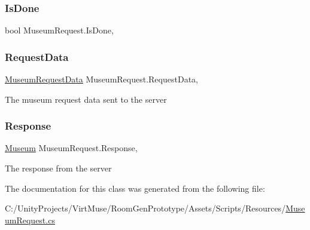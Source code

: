 \mbox{\label{class_museum_request_afed65eefeb6ae0675fe955f65e80e671}} 
\subsubsection{\texorpdfstring{Is\+Done}{IsDone}}
{\footnotesize\ttfamily bool Museum\+Request.\+Is\+Done\hspace{0.3cm}{\ttfamily [get]}, {}}

\mbox{\label{class_museum_request_aa08e270eb7e8db5c654f1db0641b71c8}} 
\subsubsection{\texorpdfstring{Request\+Data}{RequestData}}
{\footnotesize\ttfamily \mbox{\hyperlink{class_museum_request_data}{Museum\+Request\+Data}} Museum\+Request.\+Request\+Data\hspace{0.3cm}{\ttfamily [get]}, {}}



The museum request data sent to the server 

\mbox{\label{class_museum_request_aad328b5658542811993e5770a9fb052a}} 
\subsubsection{\texorpdfstring{Response}{Response}}
{\footnotesize\ttfamily \mbox{\hyperlink{class_museum}{Museum}} Museum\+Request.\+Response\hspace{0.3cm}{\ttfamily [get]}, {}}



The response from the server 



The documentation for this class was generated from the following file\+:\begin{DoxyCompactItemize}
\item 
C\+:/\+Unity\+Projects/\+Virt\+Muse/\+Room\+Gen\+Prototype/\+Assets/\+Scripts/\+Resources/\mbox{\hyperlink{_museum_request_8cs}{Museum\+Request.\+cs}}\end{DoxyCompactItemize}
